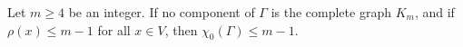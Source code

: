 Let $m \geq 4$ be an integer. If no component of $\Gamma$ is the complete graph $K_m$, and if $\rho(x) \leq m - 1$ for all $x \in V$, then $\chi_0(\Gamma) \leq m - 1$.
